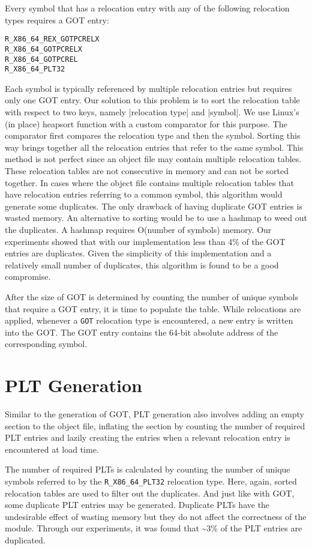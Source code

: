 Every symbol that has a relocation entry with any of the following relocation types requires a GOT entry:
\begin{verbatim}
R_X86_64_REX_GOTPCRELX
R_X86_64_GOTPCRELX
R_X86_64_GOTPCREL
R_X86_64_PLT32
\end{verbatim}
Each symbol is typically referenced by multiple relocation entries but requires only one GOT entry. Our solution to this problem is to sort the relocation table with respect to two keys, namely |relocation type| and |symbol|. We use Linux's (in place) heapsort function with a custom comparator for this purpose. The comparator first compares the relocation type and then the symbol. Sorting this way brings together all the relocation entries that refer to the same symbol. This method is not perfect since an object file may contain multiple relocation tables. These relocation tables are not consecutive in memory and can not be sorted together. In cases where the object file contains multiple relocation tables that have relocation entries referring to a common symbol, this algorithm would generate some duplicates. The only drawback of having duplicate GOT entries is wasted memory. An alternative to sorting would be to use a hashmap to weed out the duplicates. A hashmap requires O(number of symbols) memory. Our experiments showed that with our implementation less than 4\% of the GOT entries are duplicates. Given the simplicity of this implementation and a relatively small number of duplicates, this algorithm is found to be a good compromise.

After the size of GOT is determined by counting the number of unique symbols that require a GOT entry, it is time to populate the table. While relocations are applied, whenever a \verb|GOT| relocation type is encountered, a new entry is written into the GOT. The GOT entry contains the 64-bit absolute address of the corresponding symbol.

\section{PLT Generation} \label{plt_generation}
Similar to the generation of GOT, PLT generation also involves adding an empty section to the object file, inflating the section by counting the number of required PLT entries and lazily creating the entries when a relevant relocation entry is encountered at load time.

The number of required PLTs is calculated by counting the number of unique symbols referred to by the \verb|R_X86_64_PLT32| relocation type. Here, again, sorted relocation tables are used to filter out the duplicates. And just like with GOT, some duplicate PLT entries may be generated. Duplicate PLTs have the undesirable effect of wasting memory but they do not affect the correctness of the module. Through our experiments, it was found that \textasciitilde3\% of the PLT entries are duplicated.

